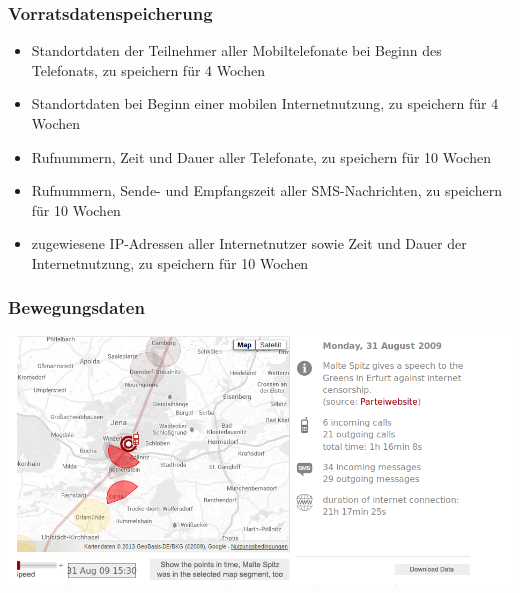 \documentclass[12pt]{beamer}
\begin{document}
\begin{frame}
{\begin{center}
{      }
    \end{center}
  }
\end{frame}

\begin{frame}
  \frametitle{Vorratsdatenspeicherung}
  \begin{itemize}
    \item<2-> Standortdaten der Teilnehmer aller Mobiltelefonate bei Beginn des Telefonats, zu speichern für 4 Wochen
    \item<3-> Standortdaten bei Beginn einer mobilen Internetnutzung, zu speichern für 4 Wochen
    \item<4-> Rufnummern, Zeit und Dauer aller Telefonate, zu speichern für 10 Wochen
    \item<5-> Rufnummern, Sende- und Empfangszeit aller SMS-Nachrichten, zu speichern für 10 Wochen
    \item<6-> zugewiesene IP-Adressen aller Internetnutzer sowie Zeit und Dauer der Internetnutzung, zu speichern für 10 Wochen
  \end{itemize}
\end{frame}

\begin{frame}
  \frametitle{Bewegungsdaten}
  \pause
  \begin{center}
    \includegraphics[height=0.7\textheight]{img/maltespitz.png}
  \end{center}
\end{frame}
\end{document}
